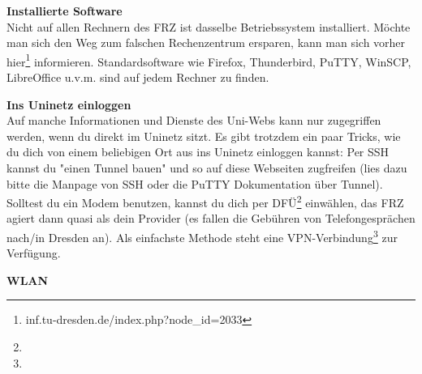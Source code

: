 \textbf{Installierte Software} \\
Nicht auf allen Rechnern des FRZ ist dasselbe Betriebssystem installiert.
Möchte man sich den Weg zum falschen Rechenzentrum ersparen, kann man sich vorher hier\footnote{inf.tu-dresden.de/index.php?node_id=2033} informieren.
Standardsoftware wie Firefox, Thunderbird, PuTTY, WinSCP, LibreOffice u.v.m. sind auf jedem Rechner zu finden.

\textbf{Ins Uninetz einloggen} \\
Auf manche Informationen und Dienste des Uni-Webs kann nur zugegriffen werden, wenn du direkt im Uninetz sitzt.
Es gibt trotzdem ein paar Tricks, wie du dich von einem beliebigen Ort aus ins Uninetz einloggen kannst:
Per SSH kannst du "einen Tunnel bauen" und so auf diese Webseiten zugfreifen (lies dazu bitte die Manpage von SSH oder die PuTTY Dokumentation über Tunnel).
Solltest du ein Modem benutzen, kannst du dich per DFÜ\footnote{} einwählen, das FRZ agiert dann quasi als dein Provider (es fallen die Gebühren von Telefongesprächen nach/in Dresden an).
Als einfachste Methode steht eine VPN-Verbindung\footnote{} zur Verfügung.

\textbf{WLAN} \\
